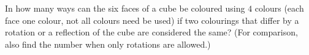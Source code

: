 In how many ways can the six faces of a cube be coloured using $4$ colours (each face one colour, not all colours need be used) if two colourings that differ by a rotation or a reflection of the cube are considered the same? (For comparison, also find the number when only rotations are allowed.)
